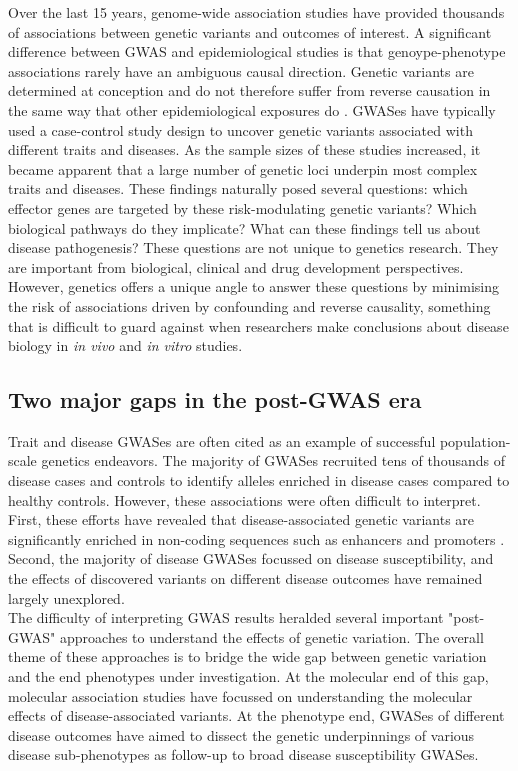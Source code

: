 Over the last 15 years, genome-wide association studies have provided thousands of associations between genetic variants and outcomes of interest. A significant difference between GWAS and epidemiological studies is that genoype-phenotype associations rarely have an ambiguous causal direction. Genetic variants are determined at conception and do not therefore suffer from reverse causation in the same way that other epidemiological exposures do \cite{Smith2007-py}. GWASes have typically used a case-control study design to uncover genetic variants associated with different traits and diseases. As the sample sizes of these studies increased, it became apparent that a large number of genetic loci underpin most complex traits and diseases. These findings naturally posed several questions: which effector genes are targeted by these risk-modulating genetic variants? Which biological pathways do they implicate? What can these findings tell us about disease pathogenesis? These questions are not unique to genetics research. They are important from biological, clinical and drug development perspectives. However, genetics offers a unique angle to answer these questions by minimising the risk of associations driven by confounding and reverse causality, something that is difficult to guard against when researchers make conclusions about disease biology in \textit{in vivo} and \textit{in vitro} studies. 

\subsection{Two major gaps in the post-GWAS era}
Trait and disease GWASes are often cited as an example of successful population-scale genetics endeavors. The majority of GWASes recruited tens of thousands of disease cases and controls to identify alleles enriched in disease cases compared to healthy controls. However, these associations were often difficult to interpret. First, these efforts have revealed that disease-associated genetic variants are significantly enriched in non-coding sequences such as enhancers and promoters \cite{Ahonen2009-eo,Degner2012-dq,Trynka2013-qs}. Second, the majority of disease GWASes focussed on disease susceptibility, and the effects of discovered variants on different disease outcomes have remained largely unexplored.\\

The difficulty of interpreting GWAS results heralded several important "post-GWAS" approaches to understand the effects of genetic variation. The overall theme of these approaches is to bridge the wide gap between genetic variation and the end phenotypes under investigation. At the molecular end of this gap, molecular association studies have focussed on understanding the molecular effects of disease-associated variants. At the phenotype end, GWASes of different disease outcomes have aimed to dissect the genetic underpinnings of various disease sub-phenotypes as follow-up to broad disease susceptibility GWASes.\\


